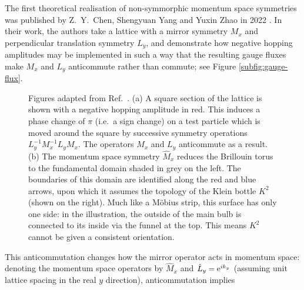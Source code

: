 The first theoretical realisation of non-symmorphic momentum space symmetries was published by Z.~Y.~Chen, Shengyuan Yang and Yuxin Zhao in 2022 \cite{CYZ_Klein-gauge}. In their work, the authors take a lattice with a mirror symmetry $M_x$ and perpendicular translation symmetry $L_y$, and demonstrate how negative hopping amplitudes may be implemented in such a way that the resulting gauge fluxes make $M_x$ and $L_y$ anticommute rather than commute; see Figure \ref{subfig:gauge-flux}.
\begin{figure}[htb!]
	\centering
	\hfil
	\caption{Figures adapted from Ref.~\cite{CYZ_Klein-gauge}. (a) A square section of the lattice is shown with a negative hopping amplitude in red. This induces a phase change of $\pi$ (i.e.\ a sign change) on a test particle which is moved around the square by successive symmetry operations $L_y^{-1}M_x^{-1}L_yM_x$. The operators $M_x$ and $L_y$ anticommute as a result. (b) The momentum space symmetry $\hat{M}_x$ reduces the Brillouin torus to the fundamental domain shaded in grey on the left. The boundaries of this domain are identified along the red and blue arrows, upon which it assumes the topology of the Klein bottle $K^2$ (shown on the right). Much like a Möbius strip, this surface has only one side: in the illustration, the outside of the main bulb is connected to its inside via the funnel at the top. This means $K^2$ cannot be given a consistent orientation.}
	\label{fig:CYZ_Klein}
\end{figure}
This anticommutation changes how the mirror operator acts in momentum space: denoting the momentum space operators by $\hat{M}_x$ and $\hat{L}_y=\operatorname{e}^{ik_y}$ (assuming unit lattice spacing in the real $y$ direction), anticommutation implies
